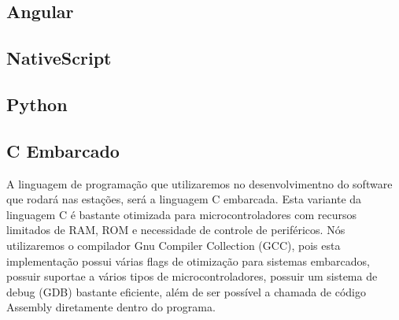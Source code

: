 	\subsection{Angular}

	\subsection{NativeScript}

	\subsection{Python}

    \subsection{C Embarcado}
    A linguagem de programação que utilizaremos no desenvolvimentno do software que rodará
    nas estações, será a linguagem C embarcada. Esta variante da linguagem C é bastante otimizada
    para microcontroladores com recursos limitados de RAM, ROM e necessidade de controle de periféricos.
    Nós utilizaremos o compilador Gnu Compiler Collection (GCC), pois esta implementação possui várias flags
    de otimização para sistemas embarcados, possuir suportae a vários tipos de microcontroladores, possuir
    um sistema de debug (GDB) bastante eficiente, além de ser possível a chamada de código Assembly diretamente
    dentro do programa.